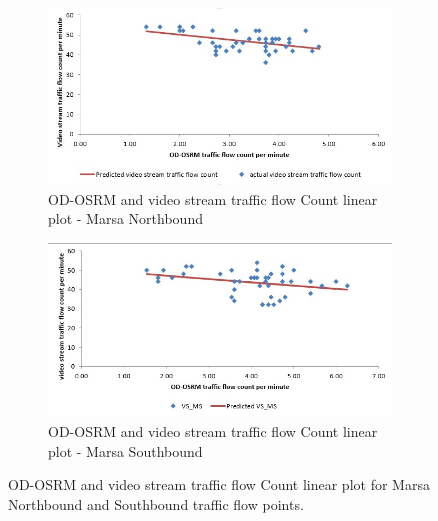 \documentclass[12pt, a4paper]{report}
\theoremstyle{definition}
\theoremstyle{definition}%
\theoremstyle{definition}%
\theoremstyle{definition}%
\theoremstyle{definition}%
\theoremstyle{definition}%
\begin{document}
\begin{figure}[!] 
	\centering
	\begin{subfigure}{0.8\textwidth}
		\centering
		\includegraphics[width=\linewidth]{traffic_flow_count_MN_line_plot.jpg} 
		\caption{\scriptsize{OD-OSRM and video stream traffic flow Count linear plot - Marsa Northbound}} \label{fig:traffic_flow_count_MN_lineplot}
	\end{subfigure}
	
	\vspace{1cm}
	\begin{subfigure}{0.8\textwidth}
		\centering
		\includegraphics[width=\linewidth]{traffic_flow_count_MS_line_plot.jpg} 
		\caption{\scriptsize{OD-OSRM and video stream traffic flow Count linear plot - Marsa Southbound}}
		\label{fig:traffic_flow_count_MS_lineplot}
	\end{subfigure}	
	\caption[Linear plot for Marsa northbound and southbound traffic flow regression model]{OD-OSRM and video stream traffic flow Count linear plot for Marsa Northbound and Southbound traffic flow points.}
	\label{fig:marsa_traffic_flow_count_plots}
\end{figure}

\end{document}

